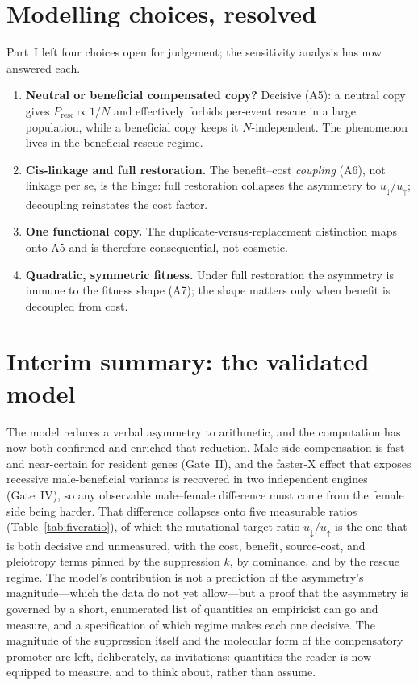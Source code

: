 \documentclass[11pt,a4paper]{article}
\newcommand{\Presc}{P_{\mathrm{resc}}}
\begin{document}
\section{Modelling choices, resolved}

Part~I left four choices open for judgement; the sensitivity analysis has now answered each.
\begin{enumerate}
\item \textbf{Neutral or beneficial compensated copy?} Decisive (A5): a neutral copy gives $\Presc\propto 1/N$ and effectively forbids per-event rescue in a large population, while a beneficial copy keeps it $N$-independent. The phenomenon lives in the beneficial-rescue regime.
\item \textbf{Cis-linkage and full restoration.} The benefit--cost \emph{coupling} (A6), not linkage per se, is the hinge: full restoration collapses the asymmetry to $u_{\downarrow}/u_{\uparrow}$; decoupling reinstates the cost factor.
\item \textbf{One functional copy.} The duplicate-versus-replacement distinction maps onto A5 and is therefore consequential, not cosmetic.
\item \textbf{Quadratic, symmetric fitness.} Under full restoration the asymmetry is immune to the fitness shape (A7); the shape matters only when benefit is decoupled from cost.
\end{enumerate}

\section{Interim summary: the validated model}

The model reduces a verbal asymmetry to arithmetic, and the computation has now both confirmed and enriched that reduction. Male-side compensation is fast and near-certain for resident genes (Gate~II), and the faster-X effect that exposes recessive male-beneficial variants is recovered in two independent engines (Gate~IV), so any observable male--female difference must come from the female side being harder. That difference collapses onto five measurable ratios (Table~\ref{tab:fiveratio}), of which the mutational-target ratio $u_{\downarrow}/u_{\uparrow}$ is the one that is both decisive and unmeasured, with the cost, benefit, source-cost, and pleiotropy terms pinned by the suppression $k$, by dominance, and by the rescue regime. The model's contribution is not a prediction of the asymmetry's magnitude---which the data do not yet allow---but a proof that the asymmetry is governed by a short, enumerated list of quantities an empiricist can go and measure, and a specification of which regime makes each one decisive. The magnitude of the suppression itself and the molecular form of the compensatory promoter are left, deliberately, as invitations: quantities the reader is now equipped to measure, and to think about, rather than assume.
\end{document}
